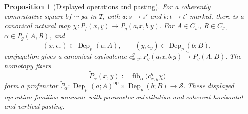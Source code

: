 \documentclass[oneside]{article}
\theoremstyle{plain}
\newtheorem{proposition}[theorem]{Proposition}
\theoremstyle{definition}
\theoremstyle{remark}
\newcommand{\Dep}{\operatorname{Dep}}
\newcommand{\Sps}{\mathcal S}
\newcommand{\fib}{\operatorname{fib}}
\newcommand{\op}{\mathrm{op}}
\begin{document}
\begin{proposition}[Displayed operations and pasting]\label{thz:prop:displayed}
For a coherently commutative square $bf\simeq ga$ in $T$, with
$a:s\to s'$ and $b:t\to t'$ marked, there is a canonical natural map $\chi:P_f(x,y)\longrightarrow P_g(a_!x,b_!y).$ For $A\in C_{s'}$, $B\in C_{t'}$,
$\alpha\in P_g(A,B)$, and
\[
 (x,\epsilon_x)\in\Dep_p(a;A),\qquad
 (y,\epsilon_y)\in\Dep_p(b;B),
\]
conjugation gives a canonical equivalence $c^g_{x,y}:P_g(a_!x,b_!y)\xrightarrow{\simeq}P_g(A,B).$ The homotopy fibers
\begin{equation}\label{thz:eq:displayed-fiber}
 \widetilde P_\alpha(x,y):=
 \fib_\alpha\bigl(c^g_{x,y}\chi\bigr)
\end{equation}
form a profunctor $\widetilde P_\alpha: \Dep_p(a;A)^{\op}\times\Dep_p(b;B) \longrightarrow\Sps.$ These displayed operation families commute with parameter substitution and
coherent horizontal and vertical pasting.
\end{proposition}
\end{document}
